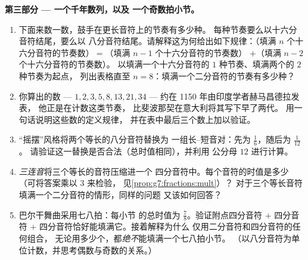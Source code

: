 \begin{problem}
\medskip
\noindent\textbf{第三部分 --- 一个千年数列，以及
一个奇数拍小节。}
\begin{enumerate}[resume]
  \item 下面来数一数，鼓手在更长音符上的节奏有多少种。
        每种节奏要么以十六分音符结尾，要么以
        八分音符结尾。请解释这为何给出如下规律：（填满
        $n$ 个十六分音符的节奏数）$=$（填满 $n - 1$ 个十六分音符的节奏数）
        $+$（填满 $n - 2$ 个十六分音符的节奏数）。
        以填满一个十六分音符的 $1$ 种节奏、填满两个的 $2$ 种节奏为起点，
        列出表格直至 $n = 8$：填满一个二分音符的节奏有多少种？
  \item 你算出的数 --- $1, 2, 3, 5, 8, 13, 21, 34$
        --- 约在 1150 年由印度学者赫马昌德拉发表，
        他正是在计数这类节奏，
        比斐波那契在意大利将其写下早了两代。
        用一句话说明这些数的定义规律，
        并在表中最后三个数上加以验证。
  \item “摇摆”风格将两个等长的八分音符替换为
        一组长--短音对：先为 $\frac16$，随后为 $\frac{1}{12}$。
        请验证这一替换是否合法（总时值相同），并利用
        公分母 $12$ 进行计算。
  \item \emph{三连音}将三个等长的音符压缩进一个
        四分音符中。每个音符的时值是多少（可将答案乘以 $3$ 来检验，
        见\cref{prop:g7:fractions:mult}）？
        对于三个等长音符填满一个二分音符的情形，同样的问题
        又该如何回答？
  \item 巴尔干舞曲采用七八拍：每小节
        的总时值为 $\frac78$。验证附点四分音符 $+$ 四分音符
        $+$ 四分音符恰好能填满它。接着解释为什么
        仅用二分音符和四分音符的任何组合，
        无论用多少个，都\emph{绝不}能填满一个七八拍小节。
        （以八分音符为单位计数，并思考偶数与奇数的关系。）
\end{enumerate}
\end{problem}
